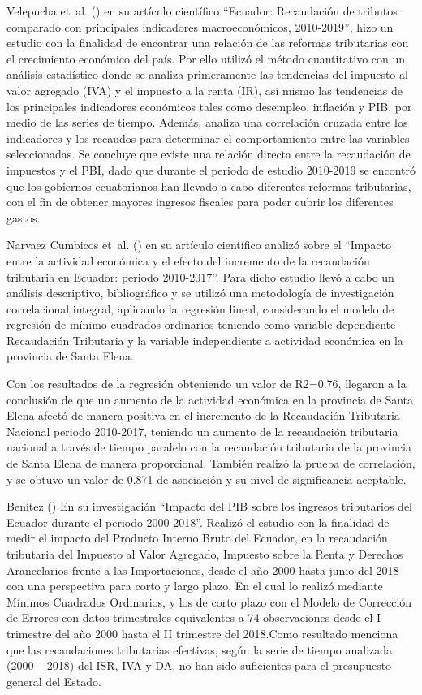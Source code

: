 \documentclass[
  jou,
  floatsintext,
  longtable,
  a4paper,
  nolmodern,
  notxfonts,
  notimes,
  12pt,
  colorlinks=true,linkcolor=blue,citecolor=blue,urlcolor=blue]{apa7}
\begin{document}
Velepucha et~al. () en su
artículo científico ``Ecuador: Recaudación de tributos comparado con
principales indicadores macroeconómicos, 2010-2019'', hizo un estudio
con la finalidad de encontrar una relación de las reformas tributarias
con el crecimiento económico del país. Por ello utilizó el método
cuantitativo con un análisis estadístico donde se analiza primeramente
las tendencias del impuesto al valor agregado (IVA) y el impuesto a la
renta (IR), así mismo las tendencias de los principales indicadores
económicos tales como desempleo, inflación y PIB, por medio de las
series de tiempo. Además, analiza una correlación cruzada entre los
indicadores y los recaudos para determinar el comportamiento entre las
variables seleccionadas. Se concluye que existe una relación directa
entre la recaudación de impuestos y el PBI, dado que durante el periodo
de estudio 2010-2019 se encontró que los gobiernos ecuatorianos han
llevado a cabo diferentes reformas tributarias, con el fin de obtener
mayores ingresos fiscales para poder cubrir los diferentes gastos.

Narvaez Cumbicos et~al.
() en su artículo
científico analizó sobre el ``Impacto entre la actividad económica y el
efecto del incremento de la recaudación tributaria en Ecuador: periodo
2010-2017''. Para dicho estudio llevó a cabo un análisis descriptivo,
bibliográfico y se utilizó una metodología de investigación
correlacional integral, aplicando la regresión lineal, considerando el
modelo de regresión de mínimo cuadrados ordinarios teniendo como
variable dependiente Recaudación Tributaria y la variable independiente
a actividad económica en la provincia de Santa Elena.

Con los resultados de la regresión obteniendo un valor de R2=0.76,
llegaron a la conclusión de que un aumento de la actividad económica en
la provincia de Santa Elena afectó de manera positiva en el incremento
de la Recaudación Tributaria Nacional periodo 2010-2017, teniendo un
aumento de la recaudación tributaria nacional a través de tiempo
paralelo con la recaudación tributaria de la provincia de Santa Elena de
manera proporcional. También realizó la prueba de correlación, y se
obtuvo un valor de 0.871 de asociación y su nivel de significancia
aceptable.

Benítez () En su investigación
``Impacto del PIB sobre los ingresos tributarios del Ecuador durante el
periodo 2000-2018''. Realizó el estudio con la finalidad de medir el
impacto del Producto Interno Bruto del Ecuador, en la recaudación
tributaria del Impuesto al Valor Agregado, Impuesto sobre la Renta y
Derechos Arancelarios frente a las Importaciones, desde el año 2000
hasta junio del 2018 con una perspectiva para corto y largo plazo. En el
cual lo realizó mediante Mínimos Cuadrados Ordinarios, y los de corto
plazo con el Modelo de Corrección de Errores con datos trimestrales
equivalentes a 74 observaciones desde el I trimestre del año 2000 hasta
el II trimestre del 2018.Como resultado menciona que las recaudaciones
tributarias efectivas, según la serie de tiempo analizada (2000 -- 2018)
del ISR, IVA y DA, no han sido suficientes para el presupuesto general
del Estado.
\end{document}
